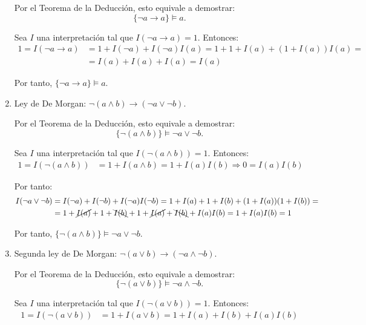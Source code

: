 \begin{ejercicio}
\begin{enumerate}
        Por el Teorema de la Deducción, esto equivale a demostrar:
        \begin{equation*}
            \{\neg a \rightarrow a\} \vDash a.
        \end{equation*}

        Sea $I$ una interpretación tal que $I(\neg a \rightarrow a) = 1$. Entonces:
        \begin{align*}
            1=I(\neg a \rightarrow a) &= 1+I(\neg a) + I(\neg a)I(a) = 1+1+I(a)+(1+I(a))I(a) =\\&= I(a)+I(a)+I(a)=I(a)
        \end{align*}

        Por tanto, $\{\neg a \rightarrow a\} \vDash a$.
        \item Ley de De Morgan: $\neg(a\land b) \rightarrow (\neg a \lor \neg b)$.
        
        Por el Teorema de la Deducción, esto equivale a demostrar:
        \begin{equation*}
            \{\neg(a\land b)\} \vDash \neg a \lor \neg b.
        \end{equation*}

        Sea $I$ una interpretación tal que $I(\neg(a\land b)) = 1$. Entonces:
        \begin{align*}
            1=I(\neg(a\land b)) &= 1+I(a\land b) = 1+I(a)I(b)
            \Longrightarrow
            0=I(a)I(b)
        \end{align*}

        Por tanto:
        \begin{align*}
            I(\neg a \lor \neg b) &= I(\neg a) + I(\neg b) + I(\neg a)I(\neg b) = 1+I(a) + 1+I(b) + (1+I(a))(1+I(b)) =\\&= 1+\cancel{I(a)} + 1+\bcancel{I(b)} + 1+\cancel{I(a)}+\bcancel{I(b)}+I(a)I(b) = 1+I(a)I(b)=1
        \end{align*}

        Por tanto, $\{\neg(a\land b)\} \vDash \neg a \lor \neg b$.
        \item Segunda ley de De Morgan: $\neg(a\lor b) \rightarrow (\neg a \land \neg b)$.
        
        Por el Teorema de la Deducción, esto equivale a demostrar:
        \begin{equation*}
            \{\neg(a\lor b)\} \vDash \neg a \land \neg b.
        \end{equation*}

        Sea $I$ una interpretación tal que $I(\neg(a\lor b)) = 1$. Entonces:
        \begin{align*}
            1=I(\neg(a\lor b)) &= 1+I(a\lor b) = 1+I(a) + I(b) + I(a)I(b)
        \end{align*}


\end{enumerate}
\end{ejercicio}
